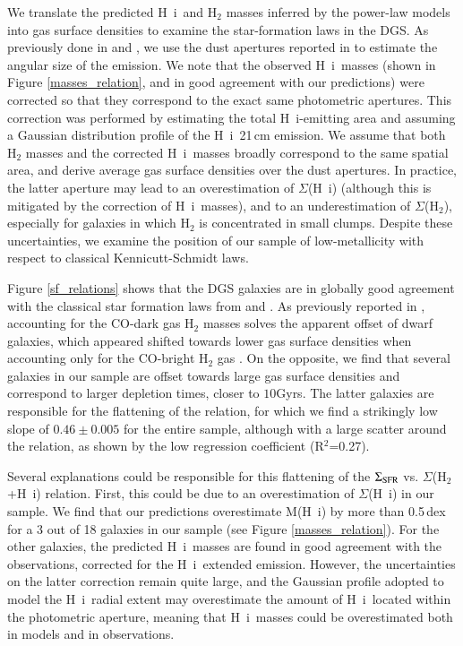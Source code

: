 \documentclass{aa}
\newcommand{\hi}{H~{\sc i}}
\begin{document}
We translate the predicted \hi\ and H$_2$ masses inferred by the power-law models into gas surface densities to examine the star-formation laws in the DGS. As previously done in \cite{Cormier_2014} and \cite{madden_tracing_2020}, we use the dust apertures reported in \cite{remy-ruyer_linking_2015} to estimate the angular size of the emission. We note that the observed \hi\ masses (shown in Figure \ref{masses_relation}, and in good agreement with our predictions) were corrected so that they correspond to the exact same photometric apertures. This correction was performed by estimating the total \hi-emitting area and assuming a Gaussian distribution profile of the \hi\ 21\,cm emission. We assume that both H$_2$ masses and the corrected \hi\ masses broadly correspond to the same spatial area, and derive average gas surface densities over the dust apertures. In practice, the latter aperture may lead to an overestimation of $\Sigma$(\hi) (although this is mitigated by the correction of \hi\ masses), and to an underestimation of $\Sigma$(H$_2$), especially for galaxies in which H$_2$ is concentrated in small clumps. Despite these uncertainties, we examine the position of our sample of low-metallicity with respect to classical Kennicutt-Schmidt laws.

Figure \ref{sf_relations} shows that the DGS galaxies are in globally good agreement with the classical star formation laws from \cite{Bigiel_2008} and \cite{Kennicutt_Reyes_2021}. As previously reported in \cite{madden_tracing_2020}, accounting for the CO-dark gas H$_2$ masses solves the apparent offset of dwarf galaxies, which appeared shifted towards lower gas surface densities when accounting only for the CO-bright H$_2$ gas \citep[e.g.,][]{Cormier_2014}. On the opposite, we find that several galaxies in our sample are offset towards large gas surface densities and correspond to larger depletion times, closer to $10$Gyrs. The latter galaxies are responsible for the flattening of the relation, for which we find a strikingly low slope of $0.46\pm0.005$ for the entire sample, although with a large scatter around the relation, as shown by the low regression coefficient (R$^2$=0.27).

Several explanations could be responsible for this flattening of the $\Sigma_{\rm SFR}$ vs. $\Sigma$(H$_2$+\hi) relation. First, this could be due to an overestimation of $\Sigma$(\hi) in our sample. We find that our predictions overestimate M(\hi) by more than 0.5\,dex for a 3 out of 18 galaxies in our sample (see Figure \ref{masses_relation}). For the other galaxies, the predicted \hi\ masses are found in good agreement with the observations, corrected for the \hi\ extended emission. However, the uncertainties on the latter correction remain quite large, and the Gaussian profile adopted to model the \hi\ radial extent may overestimate the amount of \hi\ located within the photometric aperture, meaning that \hi\ masses could be overestimated both in models and in observations.  
\end{document}
